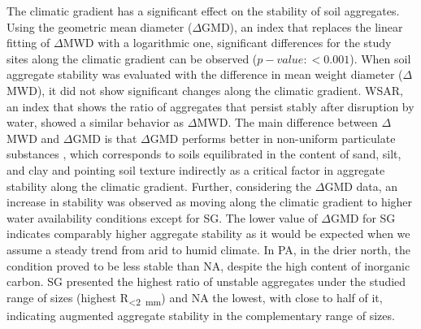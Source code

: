The climatic gradient has a significant effect on the stability of soil aggregates. Using the geometric mean diameter ($\Delta$GMD), an index that replaces the linear fitting of $\Delta$MWD with a logarithmic one, significant differences for the study sites along the climatic gradient can be observed ($p-value: <0.001$). When soil aggregate stability was evaluated with the difference in mean weight diameter ($\Delta$MWD), it did not show significant changes along the climatic gradient. WSAR, an index that shows the ratio of aggregates that persist stably after disruption by water, showed a similar behavior as $\Delta$MWD. The main difference between $\Delta$MWD and $\Delta$GMD is that $\Delta$GMD performs better in non-uniform particulate substances \citep{Hatch1929,Gardner1956}, which corresponds to soils equilibrated in the content of sand, silt, and clay \citep{Mazurak1950} and pointing soil texture indirectly as a critical factor in aggregate stability along the climatic gradient. Further, considering the $\Delta$GMD data, an increase in stability was observed as moving along the climatic gradient to higher water availability conditions except for SG. The lower value of $\Delta$GMD for SG indicates comparably higher aggregate stability as it would be expected when we assume a steady trend from arid to humid climate. In PA, in the drier north, the condition proved to be less stable than NA, despite the high content of inorganic carbon. SG presented the highest ratio of unstable aggregates under the studied range of sizes (highest R\textsubscript{<\SI{2}{\milli\meter}}) and NA the lowest, with close to half of it, indicating augmented aggregate stability in the complementary range of sizes.

